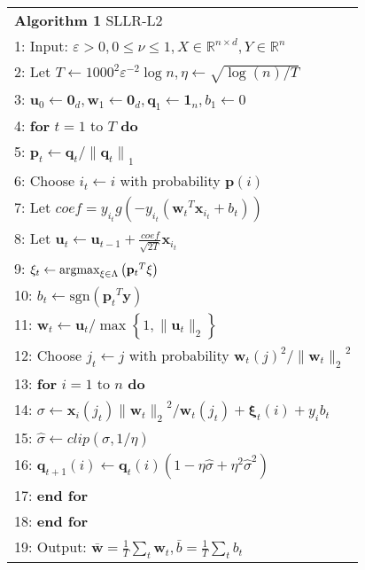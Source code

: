 \documentclass{llncs}
\newcommand{\bw}{\mathbf{w}}
\newcommand{\bu}{\mathbf{u}}
\newcommand{\bp}{\mathbf{p}}
\newcommand{\bq}{\mathbf{q}}
\newcommand{\bxi}{\mathbf{\xi}}
\newcommand{\lc}{\left(}
\newcommand{\rc}{\right)}
\newcommand{\li}{\lc i\rc}
\newcommand{\lj}{\lc j\rc}
\newcommand{\tspace}{\hspace*{2em}}
\def\argmax{\mathop{\rm argmax}}
\def\sgn{\mathrm{sgn}}
\begin{document}
	\begin{table} [ht]
	\begin{tabular}{l}
	\hline\noalign{\smallskip}
	\textbf{Algorithm 1} SLLR-L2 \\
	\noalign{\smallskip}
	\hline
	\noalign{\smallskip}
		1:    Input: $\varepsilon>0, 0\leq\nu\leq1, X\in\mathbb{R}^{n\times d}, Y\in\mathbb{R}^{n} $ \\
		2:    Let $T\leftarrow{1000}^{2}{\varepsilon}^{-2}\log n, \eta\leftarrow\sqrt{\log\lc n\rc/T}$ \\
		3:    \tspace ${\mathbf{u}}_{0}\leftarrow{\mathbf{0}}_{d},{\bw}_{1}\leftarrow{\mathbf{0}}_{d},{\mathbf{\bq}}_{1}\leftarrow{\mathbf{1}}_{n},{b}_{1}\leftarrow 0$\\
		4:    \textbf{for} $t=1$ to $T$ \textbf{do} \\
		5:    \tspace ${\bp}_{t}\leftarrow{\bq}_{t}/{\|{\bq}_{t}\|}_{1}$ \\
		6:    \tspace Choose ${i}_{t}\leftarrow i$ with probability $\bp(i)$ \\
		7:    \tspace Let $coef={y}_{{i}_{t}}g\lc-{y}_{{i}_{t}}\lc {{\bw}_{t}}^{T}{\mathbf{x}}_{i_t}+{b}_{t} \rc\rc$ \\
		8:    \tspace Let ${\bu}_{t}\leftarrow {\bu}_{t-1}+\frac{coef}{\sqrt{2T}}{\mathbf{x}}_{{i}_{t}}$ \\
		9:    \tspace\tspace ${\bxi}_{t}\leftarrow \argmax_{\bxi\in \Lambda}\lc{{\bp}_{t}}^{T}\bxi\rc$ \\
		10:   \tspace\hspace*{1.2em} ${b}_{t}\leftarrow \sgn\lc {{\bp}_{t}}^{T}\mathbf{y}\rc$ \\
		11:   \tspace ${\bw}_{t}\leftarrow {\bu}_{t}/\max \left\{1,\|{\bu}_{t}\|_2 \right\}$ \\
		12:   \tspace Choose ${j}_{t}\leftarrow j$ with probability ${{\bw}_{t}\lj}^{2}/{\|{\bw}_{t}\|_2}^{2} $ \\
		13:   \tspace \textbf{for} $i=1$ to $n$ \textbf{do} \\
		14:   \tspace\tspace $\sigma \leftarrow \mathbf{x}_{i} \lc {j}_{t}\rc{\|{\bw}_{t}\|_2}^{2}/{\bw}_{t}\lc {j}_{t} \rc+{\bxi}_{t}\li+{y}_{i}{b}_{t}$ \\
		15:   \tspace\tspace $\hat{\sigma} \leftarrow clip\lc \sigma,1/\eta \rc$ \\
		16:   \tspace\tspace ${\bq}_{t+1}\li \leftarrow {\bq}_{t}\li\lc 1-\eta\hat{\sigma} + {\eta}^{2}{\hat{\sigma}}^{2} \rc$ \\
		17:   \tspace \textbf{end for} \\
		18:   \textbf{end for} \\
		19:   Output: $\bar{\bw}=\frac{1}{T}\sum_{t}{\bw}_{t},\bar{b}=\frac{1}{T}\sum_{t}{b}_{t}$ \\
	\hline
	\end{tabular} 	
	\label{alg:1}
	\end{table}
	
\end{document}
